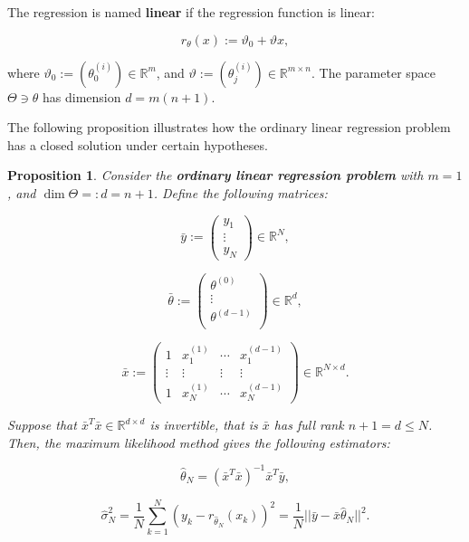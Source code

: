 \documentclass{report}
\newtheorem{proposition}{Proposition}[chapter]
\begin{document}
The regression is named \textbf{linear} if the regression function is linear:

\begin{equation}
r_\theta(x) :=  \vartheta_0 + \vartheta x,
\end{equation}

where $\vartheta_0 := (\theta_0^{(i)}) \in \mathbb{R}^m$, and $\vartheta := (\theta_j^{(i)}) \in \mathbb{R}^{m \times n}$. The parameter space $\Theta \ni \theta$ has dimension $d = m(n+1)$.

The following proposition illustrates how the ordinary linear regression problem has a closed solution under certain hypotheses.

\begin{proposition}
Consider the \textbf{ordinary linear regression problem} with $m=1$, and $\dim \Theta =: d = n + 1$. Define the following matrices:

\begin{equation}
\bar{y} := \begin{pmatrix}y_1\\
\vdots\\
y_N
\end{pmatrix} \in \mathbb{R}^N,
\end{equation}

\begin{equation}
\bar{\theta} := \begin{pmatrix}\theta^{(0)}\\
\vdots\\
\theta^{(d-1)}\\
\end{pmatrix} \in \mathbb{R}^{d},
\end{equation}

\begin{equation}
\bar{x} := \begin{pmatrix}
1 & x^{(1)}_1 & \cdots & x^{(d-1)}_1\\
\vdots & \vdots  & \vdots & \vdots \\
1 & x^{(1)}_N  &\cdots & x^{(d-1)}_N
\end{pmatrix} \in \mathbb{R}^{N \times d}.
\end{equation}

Suppose that $\bar{x}^T\bar{x} \in \mathbb{R}^{d \times d}$ is invertible, that is $\bar{x}$ has full rank $n + 1 = d \leq N$. Then, the maximum likelihood method gives the following estimators:

\begin{equation}
\hat{\theta}_N = (\bar{x}^T\bar{x})^{-1}\bar{x}^T\bar{y},
\end{equation}

\begin{equation}
\hat{\sigma}_N^2 = \frac{1}{N}\sum_{k=1}^{N}(y_k-r_{\hat{\theta}_N}(x_k))^2 = \frac{1}{N}||\bar{y} -\bar{x}\hat{\theta}_N||^2.
\end{equation}
\end{proposition}
\end{document}
